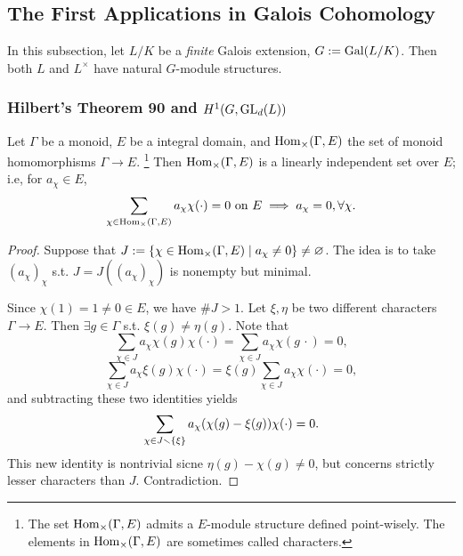 \subsection{The First Applications in Galois Cohomology}
In this subsection, let $L/K$ be a \textit{finite} Galois extension, $G := \operatorname{Gal}(L/K)$. Then both $L$ and $L^\times$ have natural $G$-module structures.

\subsubsection{Hilbert's Theorem 90 and \texorpdfstring{$H^1(G, \operatorname{GL}_d(L))$}{H1(G, L cross)}}

\begin{theorem}\label{dedekind theorem on linearly independence of characters}
    Let $\Gamma$ be a monoid, $E$ be a integral domain, and $\operatorname{Hom}_{\times}(\Gamma, E)$ the set of monoid homomorphisms $\Gamma\to E$.
    \footnote{
        The set $\operatorname{Hom}_{\times}(\Gamma, E)$ admits a $E$-module structure defined point-wisely.
        The elements in $\operatorname{Hom}_{\times}(\Gamma, E)$ are sometimes called characters.
    }
    Then $\operatorname{Hom}_{\times}(\Gamma, E)$ is a linearly independent set over $E$; i.e, for $a_\chi\in E$,
    \[\sum_{\chi\in\operatorname{Hom}_{\times}(\Gamma, E)} a_\chi\chi(\cdot) = 0\text{ on }E
    \implies a_\chi = 0,\forall\chi.\]
\end{theorem}
\begin{proof}
    Suppose that $J := \{\chi\in\operatorname{Hom}_{\times}(\Gamma, E)\mid a_\chi\ne 0\}\ne\varnothing$.
    The idea is to {\color{blue} take $(a_\chi)_\chi$ s.t.
    $J = J((a_\chi)_\chi)$ is nonempty but minimal}.

    Since $\chi(1) = 1\ne 0\in E$, we have $\# J > 1$.
    Let $\xi, \eta$ be two different characters $\Gamma\to E$. Then $\exists g\in\Gamma$ s.t. $\xi(g)\ne \eta(g)$.
    Note that \[\sum_{\chi\in J} a_\chi \chi(g)\chi(\cdot) = \sum_{\chi\in J} a_\chi\chi(g\,\cdot) = 0,\]
    \[\sum_{\chi\in J}a_\chi\xi(g)\chi(\cdot) = \xi(g)\sum_{\chi\in J}a_\chi\chi(\cdot) = 0,\]
    and subtracting these two identities yields
    \[\sum_{\chi\in J\smallsetminus\{\xi\}} a_\chi(\chi(g) - \xi(g))\chi(\cdot) = 0.\]
    This new identity is nontrivial sicne $\eta(g) - \chi(g)\ne 0$, but concerns strictly lesser characters than $J$. Contradiction.
\end{proof}

